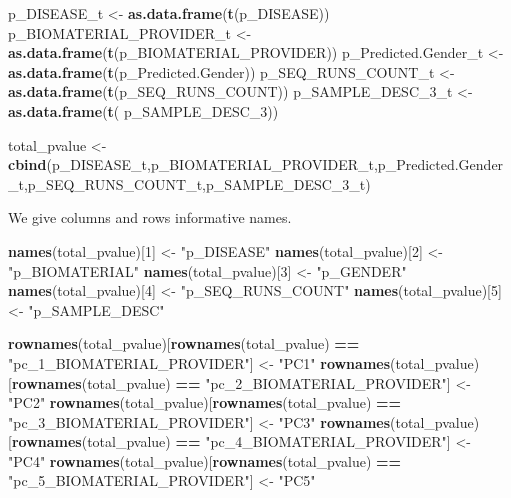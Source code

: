 \documentclass[]{article}
\newenvironment{Shaded}{\begin{snugshade}}{\end{snugshade}}
\newcommand{\KeywordTok}[1]{\textcolor[rgb]{0.13,0.29,0.53}{\textbf{#1}}}
\newcommand{\DecValTok}[1]{\textcolor[rgb]{0.00,0.00,0.81}{#1}}
\newcommand{\StringTok}[1]{\textcolor[rgb]{0.31,0.60,0.02}{#1}}
\newcommand{\OperatorTok}[1]{\textcolor[rgb]{0.81,0.36,0.00}{\textbf{#1}}}
\newcommand{\NormalTok}[1]{#1}
\begin{document}
\begin{Shaded}
\begin{Highlighting}[]
\NormalTok{p_DISEASE_t <-}\StringTok{ }\KeywordTok{as.data.frame}\NormalTok{(}\KeywordTok{t}\NormalTok{(p_DISEASE))}
\NormalTok{p_BIOMATERIAL_PROVIDER_t <-}\StringTok{ }\KeywordTok{as.data.frame}\NormalTok{(}\KeywordTok{t}\NormalTok{(p_BIOMATERIAL_PROVIDER))}
\NormalTok{p_Predicted.Gender_t <-}\StringTok{ }\KeywordTok{as.data.frame}\NormalTok{(}\KeywordTok{t}\NormalTok{(p_Predicted.Gender))}
\NormalTok{p_SEQ_RUNS_COUNT_t <-}\StringTok{ }\KeywordTok{as.data.frame}\NormalTok{(}\KeywordTok{t}\NormalTok{(p_SEQ_RUNS_COUNT))}
\NormalTok{p_SAMPLE_DESC_3_t <-}\StringTok{ }\KeywordTok{as.data.frame}\NormalTok{(}\KeywordTok{t}\NormalTok{( p_SAMPLE_DESC_}\DecValTok{3}\NormalTok{))}

\NormalTok{total_pvalue <-}\StringTok{ }\KeywordTok{cbind}\NormalTok{(p_DISEASE_t,p_BIOMATERIAL_PROVIDER_t,p_Predicted.Gender_t,p_SEQ_RUNS_COUNT_t,p_SAMPLE_DESC_3_t)}
\end{Highlighting}
\end{Shaded}

We give columns and rows informative names.

\begin{Shaded}
\begin{Highlighting}[]
\KeywordTok{names}\NormalTok{(total_pvalue)[}\DecValTok{1}\NormalTok{] <-}\StringTok{ "p_DISEASE"}
\KeywordTok{names}\NormalTok{(total_pvalue)[}\DecValTok{2}\NormalTok{] <-}\StringTok{ "p_BIOMATERIAL"}
\KeywordTok{names}\NormalTok{(total_pvalue)[}\DecValTok{3}\NormalTok{] <-}\StringTok{ "p_GENDER"}
\KeywordTok{names}\NormalTok{(total_pvalue)[}\DecValTok{4}\NormalTok{] <-}\StringTok{ "p_SEQ_RUNS_COUNT"}
\KeywordTok{names}\NormalTok{(total_pvalue)[}\DecValTok{5}\NormalTok{] <-}\StringTok{ "p_SAMPLE_DESC"}

\KeywordTok{rownames}\NormalTok{(total_pvalue)[}\KeywordTok{rownames}\NormalTok{(total_pvalue) }\OperatorTok{==}\StringTok{ "pc_1_BIOMATERIAL_PROVIDER"}\NormalTok{] <-}\StringTok{ "PC1"}
\KeywordTok{rownames}\NormalTok{(total_pvalue)[}\KeywordTok{rownames}\NormalTok{(total_pvalue) }\OperatorTok{==}\StringTok{ "pc_2_BIOMATERIAL_PROVIDER"}\NormalTok{] <-}\StringTok{ "PC2"}
\KeywordTok{rownames}\NormalTok{(total_pvalue)[}\KeywordTok{rownames}\NormalTok{(total_pvalue) }\OperatorTok{==}\StringTok{ "pc_3_BIOMATERIAL_PROVIDER"}\NormalTok{] <-}\StringTok{ "PC3"}
\KeywordTok{rownames}\NormalTok{(total_pvalue)[}\KeywordTok{rownames}\NormalTok{(total_pvalue) }\OperatorTok{==}\StringTok{ "pc_4_BIOMATERIAL_PROVIDER"}\NormalTok{] <-}\StringTok{ "PC4"}
\KeywordTok{rownames}\NormalTok{(total_pvalue)[}\KeywordTok{rownames}\NormalTok{(total_pvalue) }\OperatorTok{==}\StringTok{ "pc_5_BIOMATERIAL_PROVIDER"}\NormalTok{] <-}\StringTok{ "PC5"}
\end{Highlighting}
\end{Shaded}
\end{document}
